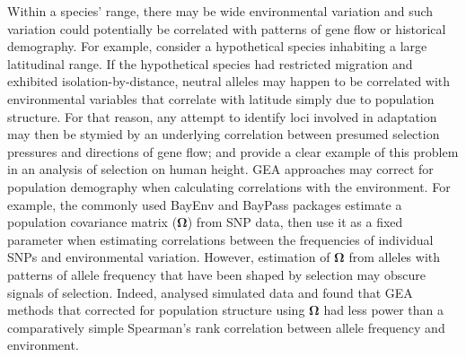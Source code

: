 \documentclass[10pt,twoside,lineno, twocolumn]{GSA_format}
\begin{document}
Within a species' range, there may be wide environmental variation and such variation could potentially be correlated with patterns of gene flow or historical demography. For example, consider a hypothetical species inhabiting a large latitudinal range. If the hypothetical species had restricted migration and exhibited isolation-by-distance, neutral alleles may happen to be correlated with environmental variables that correlate with latitude simply due to population structure. For that reason, any attempt to identify loci involved in adaptation may then be stymied by an underlying correlation between presumed selection pressures and directions of gene flow; \cite{Sohail2019} and \cite{Berg2019} provide a clear example of this problem in an analysis of selection on human height. GEA approaches may correct for population demography when calculating correlations with the environment. For example, the commonly used BayEnv \citep{Coop2010} and BayPass \citep{Gautier2015} packages estimate a population covariance matrix (\textbf{$\mathbf{\Omega}$}) from SNP data, then use it as a fixed parameter when estimating correlations between the frequencies of individual SNPs and environmental variation. However, estimation of \textbf{$\mathbf{\Omega}$} from alleles with patterns of allele frequency that have been shaped by selection may obscure signals of selection. Indeed, \cite{Lotterhos2019-ki} analysed simulated data and found that GEA methods that corrected for population structure using \textbf{$\mathbf{\Omega}$} had less power than a comparatively simple Spearman's rank correlation between allele frequency and environment. \\
\end{document}
